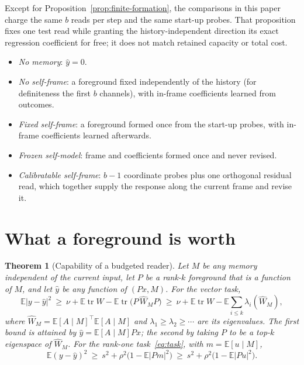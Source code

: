 \documentclass[12pt]{article}
\newtheorem{theorem}{Theorem}
\theoremstyle{definition}
\newcommand{\E}{\mathbb E}
\newcommand{\tr}{\operatorname{tr}}
\begin{document}
Except for Proposition~\ref{prop:finite-formation}, the comparisons in
this paper charge the same $b$ reads per step and the same start-up
probes. That proposition fixes one test read while granting the
history-independent direction its exact regression coefficient for
free; it does not match retained capacity or total cost.
\begin{itemize}
\item \emph{No memory}: $\hat y=0$.
\item \emph{No self-frame}: a foreground fixed independently of the history (for definiteness the first $b$ channels), with in-frame coefficients learned from outcomes.
\item \emph{Fixed self-frame}: a foreground formed once from the start-up probes, with in-frame coefficients learned afterwards.
\item \emph{Frozen self-model}: frame and coefficients formed once and never revised.
\item \emph{Calibratable self-frame}: $b-1$ coordinate probes plus one orthogonal residual read, which together supply the response along the current frame and revise it.
\end{itemize}

\section{What a foreground is worth}
\label{sec:capability}

\begin{theorem}[Capability of a budgeted reader]
\label{thm:capability}
Let $M$ be any memory independent of the current input, let $P$ be a rank-$k$ foreground that is a function of $M$, and let $\hat y$ be any function of $(Px,M)$. For the vector task,
\begin{equation}
\label{eq:capability_general}
\E|y-\hat y|^2\ \ge\ \nu+\E\tr W-\E\tr\bigl(P\,\widehat W_MP\bigr)\ \ge\ \nu+\E\tr W-\E\sum_{i\le k}\lambda_i(\widehat W_M),
\end{equation}
where $\widehat W_M=\E[A\mid M]^{\top}\E[A\mid M]$ and $\lambda_1\ge\lambda_2\ge\cdots$ are its eigenvalues. The first bound is attained by $\hat y=\E[A\mid M]Px$; the second by taking $P$ to be a top-$k$ eigenspace of $\widehat W_M$. For the rank-one task~\eqref{eq:task}, with $m=\E[u\mid M]$,
\begin{equation}
\label{eq:capability}
\E(y-\hat y)^2\ \ge\ s^2+\rho^2\bigl(1-\E|Pm|^2\bigr)\ \ge\ s^2+\rho^2\bigl(1-\E|Pu|^2\bigr).
\end{equation}
\end{theorem}
\end{document}
